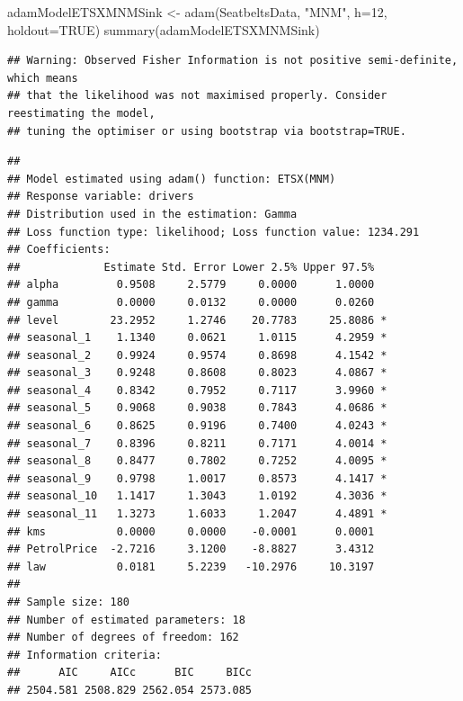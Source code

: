 \documentclass[
]{book}
\newenvironment{Shaded}{\begin{snugshade}}{\end{snugshade}}
\newcommand{\AttributeTok}[1]{\textcolor[rgb]{0.77,0.63,0.00}{#1}}
\newcommand{\ConstantTok}[1]{\textcolor[rgb]{0.00,0.00,0.00}{#1}}
\newcommand{\DecValTok}[1]{\textcolor[rgb]{0.00,0.00,0.81}{#1}}
\newcommand{\FunctionTok}[1]{\textcolor[rgb]{0.00,0.00,0.00}{#1}}
\newcommand{\NormalTok}[1]{#1}
\newcommand{\OtherTok}[1]{\textcolor[rgb]{0.56,0.35,0.01}{#1}}
\newcommand{\StringTok}[1]{\textcolor[rgb]{0.31,0.60,0.02}{#1}}
\theoremstyle{definition}
\theoremstyle{definition}
\theoremstyle{definition}
\theoremstyle{definition}
\theoremstyle{remark}
\begin{document}
\begin{Shaded}
\begin{Highlighting}[]
\NormalTok{adamModelETSXMNMSink }\OtherTok{\textless{}{-}} \FunctionTok{adam}\NormalTok{(SeatbeltsData, }\StringTok{"MNM"}\NormalTok{,}
                             \AttributeTok{h=}\DecValTok{12}\NormalTok{, }\AttributeTok{holdout=}\ConstantTok{TRUE}\NormalTok{)}
\FunctionTok{summary}\NormalTok{(adamModelETSXMNMSink)}
\end{Highlighting}
\end{Shaded}

\begin{verbatim}
## Warning: Observed Fisher Information is not positive semi-definite, which means
## that the likelihood was not maximised properly. Consider reestimating the model,
## tuning the optimiser or using bootstrap via bootstrap=TRUE.
\end{verbatim}

\begin{verbatim}
## 
## Model estimated using adam() function: ETSX(MNM)
## Response variable: drivers
## Distribution used in the estimation: Gamma
## Loss function type: likelihood; Loss function value: 1234.291
## Coefficients:
##             Estimate Std. Error Lower 2.5% Upper 97.5%  
## alpha         0.9508     2.5779     0.0000      1.0000  
## gamma         0.0000     0.0132     0.0000      0.0260  
## level        23.2952     1.2746    20.7783     25.8086 *
## seasonal_1    1.1340     0.0621     1.0115      4.2959 *
## seasonal_2    0.9924     0.9574     0.8698      4.1542 *
## seasonal_3    0.9248     0.8608     0.8023      4.0867 *
## seasonal_4    0.8342     0.7952     0.7117      3.9960 *
## seasonal_5    0.9068     0.9038     0.7843      4.0686 *
## seasonal_6    0.8625     0.9196     0.7400      4.0243 *
## seasonal_7    0.8396     0.8211     0.7171      4.0014 *
## seasonal_8    0.8477     0.7802     0.7252      4.0095 *
## seasonal_9    0.9798     1.0017     0.8573      4.1417 *
## seasonal_10   1.1417     1.3043     1.0192      4.3036 *
## seasonal_11   1.3273     1.6033     1.2047      4.4891 *
## kms           0.0000     0.0000    -0.0001      0.0001  
## PetrolPrice  -2.7216     3.1200    -8.8827      3.4312  
## law           0.0181     5.2239   -10.2976     10.3197  
## 
## Sample size: 180
## Number of estimated parameters: 18
## Number of degrees of freedom: 162
## Information criteria:
##      AIC     AICc      BIC     BICc 
## 2504.581 2508.829 2562.054 2573.085
\end{verbatim}
\end{document}
